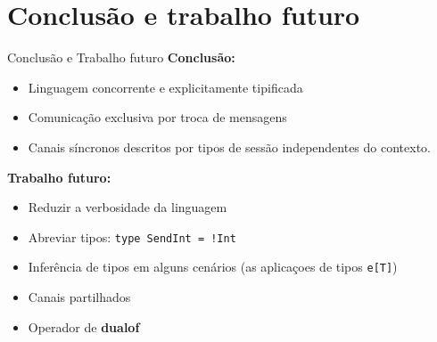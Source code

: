 \section{Conclusão e trabalho futuro}

\begin{frame}[fragile]{Conclusão e Trabalho futuro}
  \textbf{Conclusão:}
  \begin{itemize}
  \item Linguagem concorrente e explicitamente tipificada
  \item Comunicação exclusiva por troca de mensagens
  \item Canais síncronos descritos por tipos de sessão independentes do contexto.
  \end{itemize}
  \textbf{Trabalho futuro:}
  \begin{itemize}
  \item Reduzir a verbosidade da linguagem
  \item Abreviar tipos: \lstinline{type SendInt = !Int}
  \item Inferência de tipos em alguns cenários (as aplicaçoes de tipos \lstinline|e[T]|)
  \item Canais partilhados
  \item Operador de \textbf{dualof}    
  \end{itemize}
\end{frame}


